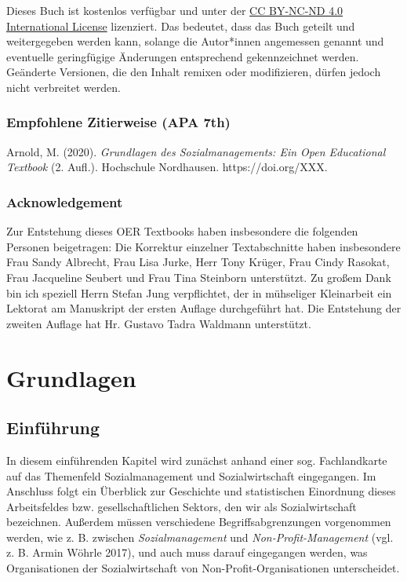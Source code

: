 \documentclass[
  letterpaper,
]{book}
\begin{document}
Dieses Buch ist kostenlos verfügbar und unter der
\href{https://creativecommons.org/licenses/by-nc-sa/4.0/}{CC BY-NC-ND
4.0 International License} lizenziert. Das bedeutet, dass das Buch
geteilt und weitergegeben werden kann, solange die Autor*innen
angemessen genannt und eventuelle geringfügige Änderungen entsprechend
gekennzeichnet werden. Geänderte Versionen, die den Inhalt remixen oder
modifizieren, dürfen jedoch nicht verbreitet werden.

\section*{Empfohlene Zitierweise (APA
7th)}\label{empfohlene-zitierweise-apa-7th}


Arnold, M. (2020). \emph{Grundlagen des Sozialmanagements: Ein Open
Educational Textbook} (2. Aufl.). Hochschule Nordhausen.
https://doi.org/XXX.

\section*{Acknowledgement}\label{acknowledgement}


Zur Entstehung dieses OER Textbooks haben insbesondere die folgenden
Personen beigetragen: Die Korrektur einzelner Textabschnitte haben
insbesondere Frau Sandy Albrecht, Frau Lisa Jurke, Herr Tony Krüger,
Frau Cindy Rasokat, Frau Jacqueline Seubert und Frau Tina Steinborn
unterstützt. Zu großem Dank bin ich speziell Herrn Stefan Jung
verpflichtet, der in mühseliger Kleinarbeit ein Lektorat am Manuskript
der ersten Auflage durchgeführt hat. Die Entstehung der zweiten Auflage
hat Hr. Gustavo Tadra Waldmann unterstützt.

\part{Grundlagen}

\chapter{Einführung}\label{einfuehrung}

In diesem einführenden Kapitel wird zunächst anhand einer sog.
Fachlandkarte auf das Themenfeld Sozialmanagement und Sozialwirtschaft
eingegangen. Im Anschluss folgt ein Überblick zur Geschichte und
statistischen Einordnung dieses Arbeitsfeldes bzw. gesellschaftlichen
Sektors, den wir als Sozialwirtschaft bezeichnen. Außerdem müssen
verschiedene Begriffsabgrenzungen vorgenommen werden, wie z. B. zwischen
\emph{Sozialmanagement} und \emph{Non-Profit-Management} (vgl. z. B.
Armin Wöhrle 2017), und auch muss darauf eingegangen werden, was
Organisationen der Sozialwirtschaft von Non-Profit-Organisationen
unterscheidet.
\end{document}
